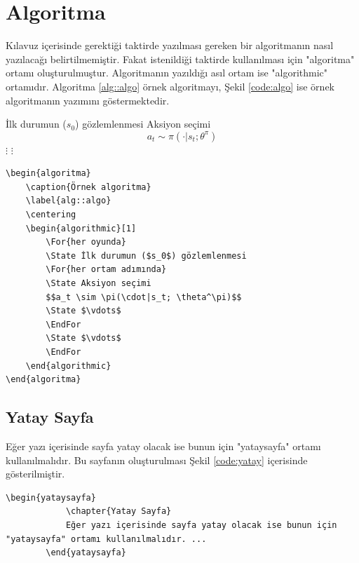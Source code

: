 \chapter{Algoritma}
Kılavuz içerisinde gerektiği taktirde yazılması gereken bir algoritmanın nasıl yazılacağı belirtilmemiştir. Fakat istenildiği taktirde kullanılması için "algoritma" ortamı oluşturulmuştur. Algoritmanın yazıldığı asıl ortam ise "algorithmic" ortamıdır. Algoritma \ref{alg::algo} örnek algoritmayı, Şekil \ref{code:algo} ise örnek algoritmanın yazımını göstermektedir.

\begin{algoritma}
	\caption{Örnek algoritma}
	\label{alg::algo}
	\centering
	\begin{algorithmic}[1]
		\State İlk durumun ($s_0$) gözlemlenmesi
		\State Aksiyon seçimi 
		$$a_t \sim \pi(\cdot|s_t; \theta^\pi)$$
		\State $\vdots$
		\EndFor
		\State $\vdots$
		\EndFor
	\end{algorithmic}
\end{algoritma}

\begin{lstlisting}[language={[LaTeX]{TeX}}, label=code:algo, caption=Örnek algoritma]
\begin{algoritma}
	\caption{Örnek algoritma}
	\label{alg::algo}
	\centering
	\begin{algorithmic}[1]
		\For{her oyunda}
		\State İlk durumun ($s_0$) gözlemlenmesi
		\For{her ortam adımında}
		\State Aksiyon seçimi 
		$$a_t \sim \pi(\cdot|s_t; \theta^\pi)$$
		\State $\vdots$
		\EndFor
		\State $\vdots$
		\EndFor
	\end{algorithmic}
\end{algoritma}
\end{lstlisting}


\begin{yataysayfa}
	\chapter{Yatay Sayfa}
	Eğer yazı içerisinde sayfa yatay olacak ise bunun için "yataysayfa" ortamı kullanılmalıdır. Bu sayfanın oluşturulması Şekil \ref{code:yatay} içerisinde gösterilmiştir.
	
	\begin{lstlisting}[language={[LaTeX]{TeX}}, label=code:yatay, caption=Yatay sayfa oluşturulması]
		\begin{yataysayfa}
			\chapter{Yatay Sayfa}
			Eğer yazı içerisinde sayfa yatay olacak ise bunun için "yataysayfa" ortamı kullanılmalıdır. ...
		\end{yataysayfa}
	\end{lstlisting}

\end{yataysayfa}




